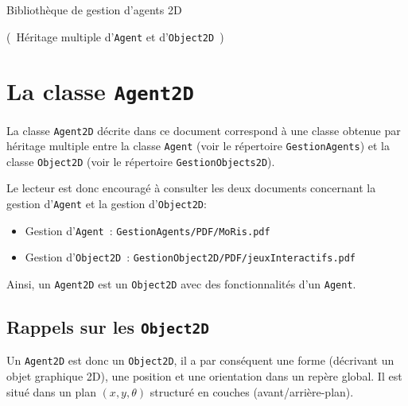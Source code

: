 \documentclass[12pt]{article}
\begin{document}
\begin{LARGE}
\begin{bf}
\begin{center}
Biblioth\`eque de gestion d'agents 2D

(~H\'eritage multiple d'{\tt Agent} et d'{\tt Object2D}~)
\end{center}
\end{bf}
\end{LARGE}


\section{La classe {\tt Agent2D}}

La classe {\tt Agent2D} d\'ecrite dans ce document correspond \`a
une classe obtenue par h\'eritage multiple entre la classe {\tt Agent}
(voir le r\'epertoire {\tt GestionAgents}) et la classe {\tt Object2D}
(voir le r\'epertoire {\tt GestionObjects2D}).

\vspace{0.3cm}

Le lecteur est donc encourag\'e \`a consulter les deux documents
concernant la gestion d'{\tt Agent} et la gestion d'{\tt Object2D}:
\begin{itemize}
\item Gestion d'{\tt Agent}~: {\tt GestionAgents/PDF/MoRis.pdf}
\item Gestion d'{\tt Object2D}~: {\tt GestionObject2D/PDF/jeuxInteractifs.pdf}
\end{itemize}

\vspace{0.3cm}
Ainsi, un {\tt Agent2D} est un {\tt Object2D} avec des fonctionnalit\'es
d'un {\tt Agent}.

\subsection{Rappels sur les {\tt Object2D}}

Un {\tt Agent2D} est donc un {\tt Object2D},
il a par cons\'equent une forme (d\'ecrivant un objet graphique 2D),
une position et une orientation dans un rep\`ere global.
Il est situ\'e dans un plan $(x,y,\theta)$
structur\'e en couches (avant/arri\`ere-plan).
\end{document}
